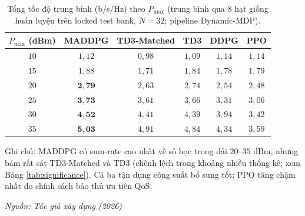 \begin{table}[t]
\centering
\small
\caption{Tổng tốc độ trung bình (b/s/Hz) theo $P_{\max}$ (trung bình qua $8$ hạt giống huấn luyện trên locked test bank, $N=32$; pipeline Dynamic-MDP).}
\label{tab:sumrate_vs_power}
\setlength{\tabcolsep}{4.5pt}
\begin{tabular}{cccccc}
\toprule
\textbf{$P_{\max}$ (dBm)} & \textbf{MADDPG} & \textbf{TD3-Matched} & \textbf{TD3} & \textbf{DDPG} & \textbf{PPO} \\
\midrule
$10$ & $1{,}12$ & $0{,}98$ & $1{,}09$ & $1{,}14$ & $1{,}14$ \\
$15$ & $1{,}88$ & $1{,}71$ & $1{,}84$ & $1{,}78$ & $1{,}79$ \\
$20$ & $\mathbf{2{,}79}$ & $2{,}63$ & $2{,}74$ & $2{,}54$ & $2{,}48$ \\
$25$ & $\mathbf{3{,}73}$ & $3{,}61$ & $3{,}66$ & $3{,}31$ & $3{,}06$ \\
$30$ & $\mathbf{4{,}52}$ & $4{,}41$ & $4{,}39$ & $3{,}94$ & $3{,}42$ \\
$35$ & $\mathbf{5{,}03}$ & $4{,}91$ & $4{,}84$ & $4{,}34$ & $3{,}59$ \\
\bottomrule
\end{tabular}

\vspace{0.2em}
{\footnotesize Ghi chú: MADDPG có sum-rate cao nhất về số học trong dải $20$--$35$ dBm, nhưng bám rất sát TD3-Matched và TD3 (chênh lệch trong khoảng nhiễu thống kê; xem Bảng \ref{tab:significance}). Cả ba tận dụng công suất bổ sung tốt; PPO tăng chậm nhất do chính sách bảo thủ ưu tiên QoS.\par}
\hfill {\footnotesize\itshape Nguồn: Tác giả xây dựng (2026)}
\end{table}
